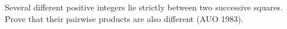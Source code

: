 Several different positive integers lie strictly between two successive squares. Prove that their pairwise products are also different (AUO 1983).
